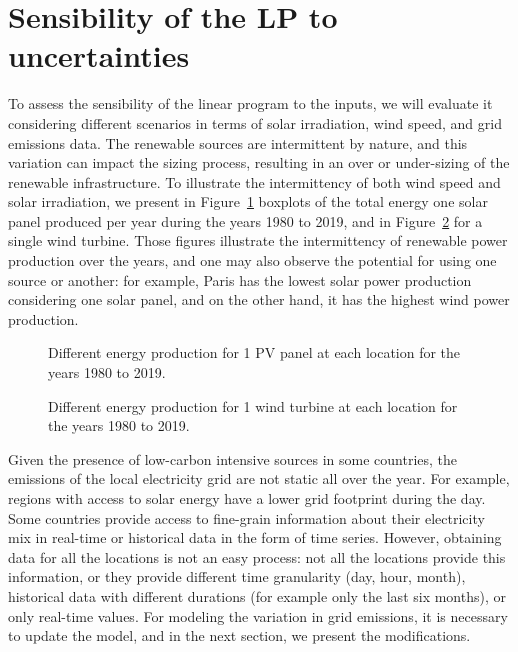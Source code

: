 \section{Sensibility of the LP to  uncertainties}
\label{sec:sensitivity}

To assess the sensibility of the linear program to the inputs, we will evaluate it considering different scenarios in terms of solar irradiation, wind speed, and grid emissions data. The renewable sources are intermittent by nature, and this variation can impact the sizing process, resulting in an over or under-sizing of the renewable infrastructure. To illustrate the intermittency of both wind speed and solar irradiation, we present in Figure~\ref{fig:pv_boxplots} boxplots of the total energy one solar panel produced per year during the years 1980 to 2019, and in Figure~\ref{fig:wt_boxplots} for a single wind turbine. Those figures illustrate the intermittency of renewable power production over the years, and one may also observe the potential for using one source or another: for example, Paris has the lowest solar power production considering one solar panel, and on the other hand, it has the highest wind power production. 


\begin{figure}[H]
  \centering
  {}
  \caption{Different energy production for 1 PV panel at each location for the years 1980 to 2019.}
  \label{fig:pv_boxplots}
\end{figure}


\begin{figure}[H]
  \centering
  {}
  \caption{Different energy production for 1 wind turbine at each location for the years 1980 to 2019.}
  \label{fig:wt_boxplots}
\end{figure}



Given the presence of low-carbon intensive sources in some countries, the emissions of the local electricity grid are not static all over the year. For example, regions with access to solar energy have a lower grid footprint during the day. Some countries provide access to fine-grain information about their electricity mix in real-time or historical data in the form of time series. However, obtaining data for all the locations is not an easy process: not all the locations provide this information, or they provide different time granularity (day, hour, month), historical data with different durations (for example only the last six months), or only real-time values. For modeling the variation in grid emissions, it is necessary to update the model, and in the next section, we present the modifications.


